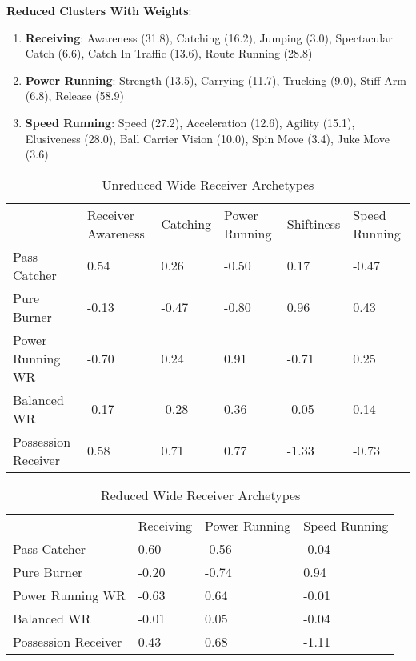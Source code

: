 \documentclass[11pt]{article}
\begin{document}
\textbf{Reduced Clusters With Weights}:

\begin{enumerate}
\item{\textbf{Receiving}}: Awareness (31.8), Catching (16.2), Jumping (3.0), Spectacular Catch (6.6), Catch In Traffic (13.6), Route Running (28.8)
\item{\textbf{Power Running}}: Strength (13.5), Carrying (11.7), Trucking (9.0), Stiff Arm (6.8), Release (58.9)
\item{\textbf{Speed Running}}: Speed (27.2), Acceleration (12.6), Agility (15.1), Elusiveness (28.0), Ball Carrier Vision (10.0), Spin Move (3.4), Juke Move (3.6)
\end{enumerate}

\begin{table}[]
\centering
\caption{Unreduced Wide Receiver Archetypes}
\label{UnreducedWideReceiver}
\begin{tabular}{llllll}
                    & Receiver Awareness & Catching & Power Running & Shiftiness & Speed Running \\
Pass Catcher        & 0.54               & 0.26     & -0.50         & 0.17       & -0.47         \\
Pure Burner         & -0.13              & -0.47    & -0.80         & 0.96       & 0.43          \\
Power Running WR    & -0.70              & 0.24     & 0.91          & -0.71      & 0.25          \\
Balanced WR         & -0.17              & -0.28    & 0.36          & -0.05      & 0.14          \\
Possession Receiver & 0.58               & 0.71     & 0.77          & -1.33      & -0.73        
\end{tabular}
\end{table}

\begin{table}[]
\centering
\caption{Reduced Wide Receiver Archetypes}
\label{ReducedWideReceiver}
\begin{tabular}{llll}
                    & Receiving & Power Running & Speed Running \\
Pass Catcher        & 0.60      & -0.56         & -0.04         \\
Pure Burner         & -0.20     & -0.74         & 0.94          \\
Power Running WR    & -0.63     & 0.64          & -0.01         \\
Balanced WR         & -0.01     & 0.05          & -0.04         \\
Possession Receiver & 0.43      & 0.68          & -1.11        
\end{tabular}
\end{table}
\end{document}
